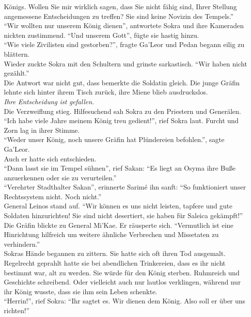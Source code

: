 Königs. Wollen Sie mir wirklich sagen, dass Sie nicht fähig sind, Ihrer Stellung angemessene 
Entscheidungen zu treffen? Sie sind keine Novizin des Tempels.''\\
``Wir wollten nur unserem König dienen'', antwortete Sokra und ihre Kameraden nickten zustimmend. 
``Und unserem Gott'', fügte sie hastig hinzu.\\
``Wie viele Zivilisten sind gestorben?'', fragte Ga'Leor und Pedan begann eilig zu blättern.\\
Wieder zuckte Sokra mit den Schultern und grinste sarkastisch. ``Wir haben nicht gezählt.''\\
Die Antwort war nicht gut, dass bemerkte die Soldatin gleich. Die junge Gräfin lehnte sich hinter 
ihrem Tisch zurück, ihre Miene blieb ausdruckslos.\\
\textit{Ihre Entscheidung ist gefallen.}\\
Die Verzweiflung stieg. Hilfesuchend sah Sokra zu den Priestern und Generälen.\\
``Ich habe viele Jahre meinem König treu gedient!'', rief Sokra laut. Furcht und Zorn lag in ihrer 
Stimme.\\
``Weder unser König, noch unsere Gräfin hat Plündereien befohlen.'', sagte Ga'Leor.\\
Auch er hatte sich entschieden.\\
``Dann lasst sie im Tempel sühnen'', rief Sakan: ``Es liegt an Osyma ihre Buße anzuerkennen oder 
sie zu verurteilen.''\\
``Verehrter Stadthalter Sakan'', erinnerte Sarimé ihn sanft: ``So funktioniert unser Rechtssystem 
nicht. Noch nicht.''\\
General Leinos stand auf. ``Wir können es uns nicht leisten, tapfere und gute Soldaten 
hinzurichten! Sie sind nicht desertiert, sie haben für Saleica gekämpft!''\\
Die Gräfin blickte zu General Mi'Kae. Er räusperte sich. ``Vermutlich ist eine Hinrichtung 
hilfreich um weitere ähnliche Verbrechen und Missetaten zu verhindern.''\\
Sokras Hände begannen zu zittern. Sie hatte sich oft ihren Tod ausgemalt. Regelrecht geprahlt hatte 
sie bei abendlichen Trinkereien, dass es ihr nicht bestimmt war, alt zu werden. Sie würde für den 
König sterben. Ruhmreich und Geschichte schreibend. Oder vielleicht auch nur lautlos verklingen, 
während nur ihr König wusste, dass sie ihm sein Leben schenkte.\\
``Herrin!'', rief Sokra: ``Ihr sagtet es. Wir dienen dem König. Also soll er über uns richten!''\\
